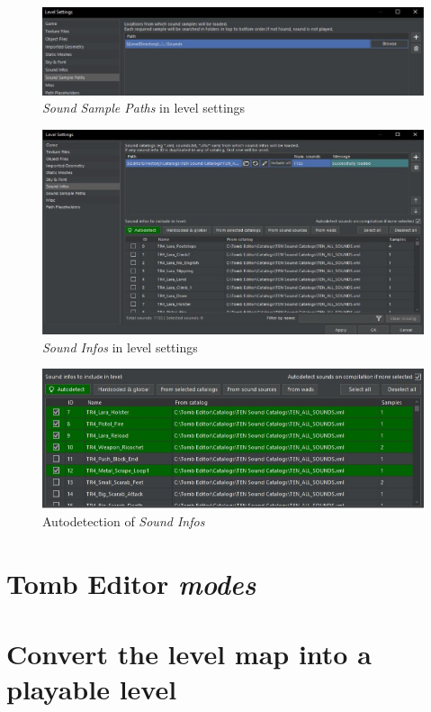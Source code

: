 \begin{figure}
    \centering
     \includegraphics[width=1\textwidth]{screenshots/1006.png}
     \caption{\emph{Sound Sample Paths} in level settings}
     \label{fig:TESoundSamplePaths} 
\end{figure}

\begin{figure}
    \centering
     \includegraphics[width=1\textwidth]{screenshots/1007.png}
     \caption{\emph{Sound Infos} in level settings}
     \label{fig:TESoundCatalogs} 
\end{figure}

\begin{figure}
    \centering
     \includegraphics[width=1\textwidth]{screenshots/16.jpg}
     \caption{Autodetection of \emph{Sound Infos}}
     \label{fig:TEAutoSoundInfos} 
\end{figure}


\chapter{Tomb Editor \emph{modes}}

\chapter{Convert the level map into a playable level}
